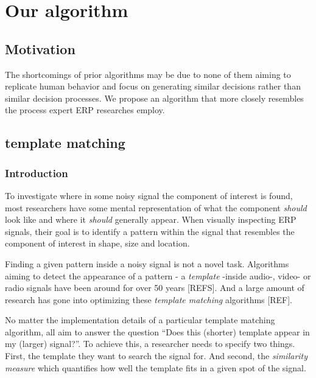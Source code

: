 \documentclass[
  man,floatsintext]{apa7}
\begin{document}
\hypertarget{our-algorithm}{%
\section{Our algorithm}\label{our-algorithm}}

\hypertarget{motivation}{%
\subsection{Motivation}\label{motivation}}

The shortcomings of prior algorithms may be due to none of them aiming to replicate human behavior and focus on generating similar decisions rather than similar decision processes. We propose an algorithm that more closely resembles the process expert ERP researches employ.

\hypertarget{template-matching}{%
\subsection{template matching}\label{template-matching}}

\hypertarget{introduction}{%
\subsubsection{Introduction}\label{introduction}}

To investigate where in some noisy signal the component of interest is found, most researchers have some mental representation of what the component \emph{should} look like and where it \emph{should} generally appear. When visually inspecting ERP signals, their goal is to identify a pattern within the signal that resembles the component of interest in shape, size and location.

Finding a given pattern inside a noisy signal is not a novel task. Algorithms aiming to detect the appearance of a pattern - a \emph{template} -inside audio-, video- or radio signals have been around for over 50 years {[}REFS{]}. And a large amount of research has gone into optimizing these \emph{template matching} algorithms {[}REF{]}.

No matter the implementation details of a particular template matching algorithm, all aim to answer the question ``Does this (shorter) template appear in my (larger) signal?''. To achieve this, a researcher needs to specify two things. First, the template they want to search the signal for. And second, the \emph{similarity measure} which quantifies how well the template fits in a given spot of the signal.
\end{document}
